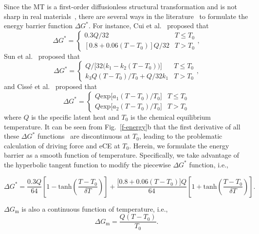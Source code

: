 \documentclass[reprint,3p,sort&compress,times,onecolumn]{elsarticle}
\begin{document}
Since the MT is a first-order diffusionless structural transformation and is not sharp in real materials~\cite{manosa2017materials}, there are several ways in the literature~\cite{cisse2020elastocaloric,cui2017three,sun2019non} to formulate the energy barrier function $\Delta G^*$. For instance, Cui et al.~\cite{cui2017three} proposed that
\begin{equation}
\Delta G^*=
\begin{cases}
0.3Q / 32& T\leq T_0\\
[0.8+0.06(T-T_0)]Q / 32& T>T_0
\end{cases} ,
\end{equation}
Sun et al.~\cite{sun2019non} proposed that
\begin{equation}
\Delta G^*=
\begin{cases}
Q/\big[32\big(k_1-k_2(T-T_0)\big)\big]& T\leq T_0\\
k_3Q(T-T_0)/T_0+Q/32k_1& T>T_0
\end{cases} ,
\end{equation}
and Ciss{\'e} et al.~\cite{cisse2020elastocaloric} proposed that
\begin{equation}
\Delta G^*=
\begin{cases}
Q \text{exp}\big[a_1(T-T_0)/T_0 \big]& T\leq T_0\\
Q \text{exp}\big[a_2(T-T_0)/T_0 \big]& T>T_0
\end{cases} 
\end{equation}
where $Q$ is the specific latent heat and $T_0$ is the chemical equilibrium temperature.
It can be seen from Fig.~\ref{f-energy}b that the first derivative of all these $\Delta G^*$ functions~\cite{cisse2020elastocaloric,cui2017three,sun2019non} are discontinuous at $T_0$, leading to the problematic calculation of driving force and eCE at $T_0$. Herein, we formulate the energy barrier as a smooth function of temperature. Specifically, we take advantage of the hyperbolic tangent function to modify the piecewise $\Delta G^*$ function, i.e.,

\begin{equation}
\Delta G^*=  \frac{0.3Q}{64}\left[ 1-\text{tanh} \left( \frac{T-T_0}{\delta T} \right) \right]  +\frac{\big[ 0.8+0.06(T-T_0) \big] Q}{64}\left[ 1+\text{tanh} \left( \frac{T-T_0}{\delta T} \right) \right].\label{eq4}
\end{equation}

$\Delta G_{\text{m}}$ is also a continuous function of temperature, i.e.,
\begin{equation}
\Delta G_{\text{m}} = \frac{Q(T-T_0)}{T_0}.
\end{equation}
\end{document}

